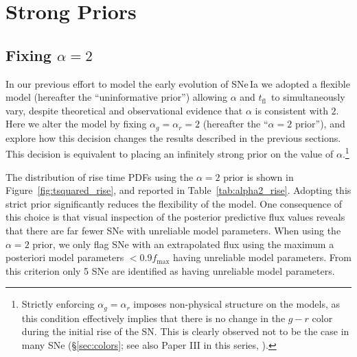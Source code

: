 \documentclass[twocolumn]{./aastex63}
\newcommand{\tfl}{$t_\mathrm{fl}$}
\begin{document}
\section{Strong Priors}\label{sec:strong_priors}

\subsection{Fixing $\alpha = 2$}

In our previous effort to model the early evolution of SNe\,Ia we adopted a
flexible model (hereafter the ``uninformative prior'') allowing $\alpha$ and
\tfl\ to simultaneously vary, despite theoretical \citep{Arnett82,Riess99a} and
observational \citep{Conley06,Hayden10,Ganeshalingam11} evidence that $\alpha$
is consistent with $2$. Here we alter the model by fixing $\alpha_g = \alpha_r
= 2$ (hereafter the ``$\alpha = 2$ prior''), and explore how this decision
changes the results described in the previous sections. This decision is
equivalent to placing an infinitely strong prior on the value of
$\alpha$.\footnote{Strictly enforcing $\alpha_g = \alpha_r$ imposes
non-physical structure on the models, as this condition effectively implies
that there is no change in the $g - r$ color during the initial rise of the
SN. This is clearly observed not to be the case in many SNe
(\S\ref{sec:colors}; see also Paper III in this series, \citealt{Bulla20}).}

The distribution of rise time PDFs using the $\alpha = 2$ prior is shown in
Figure~\ref{fig:tsquared_rise}, and reported in Table~\ref{tab:alpha2_rise}.
Adopting this strict prior significantly reduces the flexibility of the model.
One consequence of this choice is that visual inspection of the posterior
predictive flux values reveals that there are far fewer SNe with unreliable
model parameters. When using the $\alpha = 2$ prior, we only flag SNe with an
extrapolated flux using the maximum a posteriori model parameters $< 0.9
f_\mathrm{max}$  having unreliable model
parameters. From this criterion only 5 SNe are identified as having unreliable
model parameters.


\end{document}
